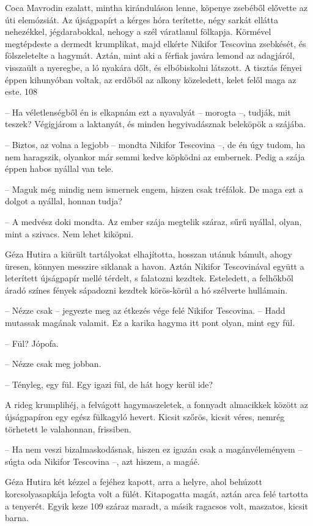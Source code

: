 \documentclass{IEEEtran}
\begin{document}
Coca Mavrodin ezalatt, mintha kiránduláson lenne, köpenye zsebéből elővette az
úti elemózsiát. Az újságpapírt a kérges hóra terítette, négy sarkát ellátta
nehezékkel, jégdarabokkal, nehogy a szél váratlanul fölkapja. Körmével
megtépdeste a dermedt krumplikat, majd elkérte Nikifor Tescovina zsebkését, és
fölszeletelte a hagymát. Aztán, mint aki a férfiak javára lemond az adagjáról,
visszaült a nyeregbe, a ló nyakára dőlt, és elbóbiskolni látszott. A tisztás
fényei éppen kihunyóban voltak, az erdőből az alkony közeledett, kelet felől
maga az este.
108

– Ha véletlenségből én is elkapnám ezt a nyavalyát – morogta –, tudják, mit
teszek? Végigjárom a laktanyát, és minden hegyivadásznak beleköpök a szájába.

– Biztos, az volna a legjobb – mondta Nikifor Tescovina –, de én úgy tudom, ha
nem haragszik, olyankor már semmi kedve köpködni az embernek. Pedig a szája
éppen habos nyállal van tele.

– Maguk még mindig nem ismernek engem, hiszen csak tréfálok. De maga ezt a
dolgot a nyállal, honnan tudja?

– A medvész doki mondta. Az ember szája megtelik száraz, sűrű nyállal, olyan,
mint a szivacs. Nem lehet kiköpni.

Géza Hutira a kiürült tartályokat elhajította, hosszan utánuk bámult, ahogy
üresen, könnyen messzire siklanak a havon. Aztán Nikifor Tescovinával együtt a
leterített újságpapír mellé térdelt, s falatozni kezdtek. Esteledett, a
felhőkből áradó színes fények sápadozni kezdtek körös-körül a hó szélverte
hullámain.

– Nézze csak – jegyezte meg az étkezés vége felé Nikifor Tescovina. – Hadd
mutassak magának valamit. Ez a karika hagyma itt pont olyan, mint egy fül.

– Fül? Jópofa.

– Nézze csak meg jobban.

– Tényleg, egy fül. Egy igazi fül, de hát hogy kerül ide?

A rideg krumplihéj, a felvágott hagymaszeletek, a fonnyadt almacikkek között
az újságpapíron egy egész fülkagyló hevert. Kicsit szőrös, kicsit véres,
nemrég törhetett le valahonnan, frissiben.

– Ha nem veszi bizalmaskodásnak, hiszen ez igazán csak a magánvéleményem –
súgta oda Nikifor Tescovina –, azt hiszem, a magáé.

Géza Hutira két kézzel a fejéhez kapott, arra a helyre, ahol behúzott
korcsolyasapkája lefogta volt a fülét. Kitapogatta magát, aztán arca felé
tartotta a tenyerét. Egyik keze 109 száraz maradt, a másik ragacsos volt,
maszatos, kicsit barna.
\end{document}

